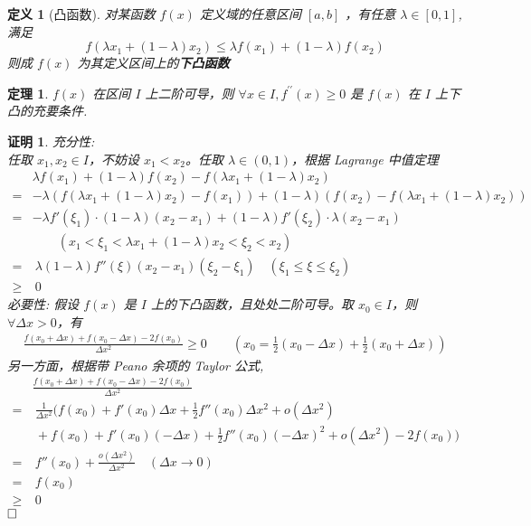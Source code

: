 \documentclass{ctexart}
\newcommand{\。}{．} %
\newcommand{\dds}{^{\prime\prime}}
\newenvironment{lvse}{
    \begin{tcolorbox}[enhanced, colback=qlv, boxrule=0pt, frame hidden,
        borderline west={0.7mm}{0.1mm}{slv}]
    }
    {\end{tcolorbox}}
\newenvironment{lanse}{
    \begin{tcolorbox}[enhanced, colback=qlan, boxrule=0pt, frame hidden,
        borderline west={0.7mm}{0.1mm}{slan}]
    }
    {\end{tcolorbox}}
\newenvironment{huangse}{
    \begin{tcolorbox}[enhanced, colback=qhuang, boxrule=0pt, frame hidden,
        borderline west={0.7mm}{0.1mm}{shuang}]
    }
    {\end{tcolorbox}}
\theoremstyle{t} %
\newtheorem{dyhj}{\color{slv} 定义}[subsection] %
\newtheorem{dlhj}{\color{shuang} 定理}[subsection]
\newtheorem*{zmhj}{\color{slan} 证明}
\newenvironment{dy}{\begin{lvse}\begin{dyhj}}{\end{dyhj}\end{lvse}}
\newenvironment{zm}{\begin{lanse}\begin{zmhj}}{$\hfill \square$\end{zmhj}\end{lanse}}
\newenvironment{dl}{\begin{huangse}\begin{dlhj}}{\end{dlhj}\end{huangse}}
\begin{document}
\begin{dy}[凸函数]
    对某函数 $f(x)$ 定义域的任意区间 $[a, b]$ ，有任意 $\lambda \in [0, 1]$, 满足
    \[
        f(\lambda x_1 + (1 - \lambda) x_2) \leq \lambda f(x_1) + (1 - \lambda) f(x_2)
    \]
    则成 $f(x)$ 为其定义区间上的\textbf{下凸函数}
\end{dy}

\begin{dl}
    $f(x)$ 在区间 $I$ 上二阶可导，则 $\forall x \in I, f\dds(x) \geqslant 0$ 是 $f(x)$ 在 $I$ 上下凸的充要条件. 
\end{dl}

\begin{zm}
    充分性: \\
    任取 $x_1, x_2 \in I$，不妨设 $x_1 < x_2$。任取 $\lambda \in (0,1)$，根据 Lagrange 中值定理
    \begin{align*}
        & \lambda f(x_1) + (1 - \lambda) f(x_2) - f(\lambda x_1 + (1 - \lambda)x_2) \\
        = & -\lambda \left( f(\lambda x_1 + (1 - \lambda)x_2) - f(x_1) \right) + (1 - \lambda) \left( f(x_2) - f(\lambda x_1 + (1 - \lambda)x_2) \right) \\
        = & -\lambda f'(\xi_1) \cdot (1 - \lambda)(x_2 - x_1) + (1 - \lambda)f'(\xi_2) \cdot \lambda(x_2 - x_1) \quad \\
        & \qquad (x_1 < \xi_1 < \lambda x_1 + (1 - \lambda)x_2 < \xi_2 < x_2) \\
        = & \ \lambda (1 - \lambda) f''(\xi) (x_2 - x_1)(\xi_2 - \xi_1) \quad (\xi_1 \leq \xi \leq \xi_2) \\
        \geqslant & \  0
    \end{align*}
    必要性: 假设 $f(x)$ 是 $I$ 上的下凸函数，且处处二阶可导。取 $x_0 \in I$，则 $\forall \Delta x > 0$，有
    \begin{align*}
        \frac{f(x_0 + \Delta x) + f(x_0 - \Delta x) - 2f(x_0)}{\Delta x^2} \geq 0 
        \qquad \left( x_0 = \frac{1}{2} (x_0 - \Delta x) + \frac{1}{2}(x_0 + \Delta x) \right)
    \end{align*}
    另一方面，根据带 Peano 余项的 Taylor 公式, 
    \begin{align*}
        & \frac{f(x_0 + \Delta x) + f(x_0 - \Delta x) - 2f(x_0)}{\Delta x^2} \\
        = & \ \frac{1}{\Delta x^2} \Bigg( f(x_0) + f'(x_0) \Delta x + \frac{1}{2} f''(x_0) \Delta x^2 + o(\Delta x^2)  \\
        & \  + f(x_0) + f'(x_0)(-\Delta x) + \frac{1}{2} f''(x_0)(-\Delta x)^2 + o(\Delta x^2) - 2f(x_0) \Bigg)\\
        = &\  f''(x_0) + \frac{o(\Delta x^2)}{\Delta x^2} \quad (\Delta x \to 0) \\
        = & \ f(x_0) \\
        \geqslant & \ 0
    \end{align*}
\end{zm}
\end{document}
